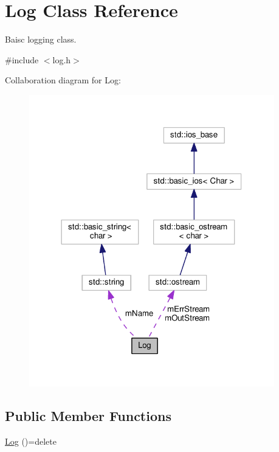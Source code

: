 \hypertarget{classLog}{}\section{Log Class Reference}
\label{classLog}


Baisc logging class.  




{\ttfamily \#include $<$log.\+h$>$}



Collaboration diagram for Log\+:\nopagebreak
\begin{figure}[H]
\begin{center}
\leavevmode
\includegraphics[width=302pt]{classLog__coll__graph}
\end{center}
\end{figure}
\subsection*{Public Member Functions}
\begin{DoxyCompactItemize}
\item 
\hyperlink{classLog_ac1cfcca90128605a5beec14beca019a2}{Log} ()=delete
\end{DoxyCompactItemize}
